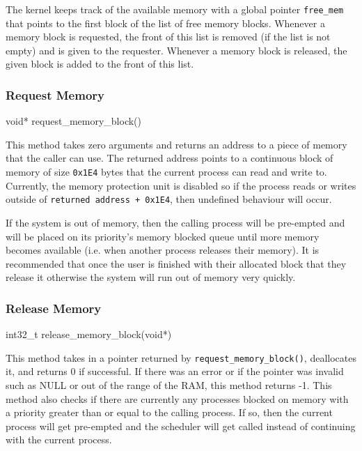 \documentclass[se]{uw-wkrpt}
\begin{document}
The kernel keeps track of the available memory with a global pointer \texttt{free\_mem} that points to the first block of the list of free memory blocks. Whenever a memory block is requested, the front of this list is removed (if the list is not empty) and is given to the requester. Whenever a memory block is released, the given block is added to the front of this list.

\subsubsection{Request Memory}
\begin{code}
void* request_memory_block()
\end{code}

This method takes zero arguments and returns an address to a piece of memory that the caller can use. The returned address points to a continuous block of memory of size \texttt{0x1E4} bytes that the current process can read and write to. Currently, the memory protection unit is disabled so if the process reads or writes outside of \texttt{returned address + 0x1E4}, then undefined behaviour will occur.

If the system is out of memory, then the calling process will be pre-empted and will be placed on its priority's memory blocked queue until more memory becomes available (i.e. when another process releases their memory). It is recommended that once the user is finished with their allocated block that they release it otherwise the system will run out of memory very quickly.

\subsubsection{Release Memory}
\label{sec:release-memory-block}
\begin{code}
int32_t release_memory_block(void*)
\end{code}

This method takes in a pointer returned by \texttt{request\_memory\_block()}, deallocates it, and returns 0 if successful. If there was an error or if the pointer was invalid such as NULL or out of the range of the RAM, this method returns -1. This method also checks if there are currently any processes blocked on memory with a priority greater than or equal to the calling process. If so, then the current process will get pre-empted and the scheduler will get called instead of continuing with the current process.
\end{document}
